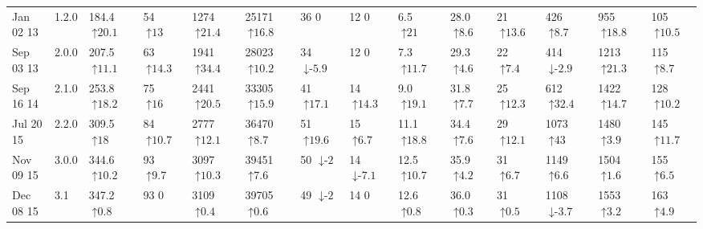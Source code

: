 \begin{tabular}{ll|llllll|lll|lll}
Jan 02 13 & 1.2.0 & 184.4 {\tiny $\uparrow\text{20.1}$} & 54 {\tiny $\uparrow\text{13}$} & 1274 {\tiny $\uparrow\text{21.4}$} & 25171 {\tiny $\uparrow\text{16.8}$} & 36 {\tiny $\text{0}$} & 12 {\tiny $\text{0}$} & 6.5 {\tiny $\uparrow\text{21}$} & 28.0 {\tiny $\uparrow\text{8.6}$} & 21 {\tiny $\uparrow\text{13.6}$} & 426 {\tiny $\uparrow\text{8.7}$} & 955 {\tiny $\uparrow\text{18.8}$} & 105 {\tiny $\uparrow\text{10.5}$} \\
Sep 03 13 & 2.0.0 & 207.5 {\tiny $\uparrow\text{11.1}$} & 63 {\tiny $\uparrow\text{14.3}$} & 1941 {\tiny $\uparrow\text{34.4}$} & 28023 {\tiny $\uparrow\text{10.2}$} & 34 {\tiny $\downarrow\text{-}\text{5.9}$} & 12 {\tiny $\text{0}$} & 7.3 {\tiny $\uparrow\text{11.7}$} & 29.3 {\tiny $\uparrow\text{4.6}$} & 22 {\tiny $\uparrow\text{7.4}$} & 414 {\tiny $\downarrow\text{-}\text{2.9}$} & 1213 {\tiny $\uparrow\text{21.3}$} & 115 {\tiny $\uparrow\text{8.7}$} \\
Sep 16 14 & 2.1.0 & 253.8 {\tiny $\uparrow\text{18.2}$} & 75 {\tiny $\uparrow\text{16}$} & 2441 {\tiny $\uparrow\text{20.5}$} & 33305 {\tiny $\uparrow\text{15.9}$} & 41 {\tiny $\uparrow\text{17.1}$} & 14 {\tiny $\uparrow\text{14.3}$} & 9.0 {\tiny $\uparrow\text{19.1}$} & 31.8 {\tiny $\uparrow\text{7.7}$} & 25 {\tiny $\uparrow\text{12.3}$} & 612 {\tiny $\uparrow\text{32.4}$} & 1422 {\tiny $\uparrow\text{14.7}$} & 128 {\tiny $\uparrow\text{10.2}$} \\
Jul 20 15 & 2.2.0 & 309.5 {\tiny $\uparrow\text{18}$} & 84 {\tiny $\uparrow\text{10.7}$} & 2777 {\tiny $\uparrow\text{12.1}$} & 36470 {\tiny $\uparrow\text{8.7}$} & 51 {\tiny $\uparrow\text{19.6}$} & 15 {\tiny $\uparrow\text{6.7}$} & 11.1 {\tiny $\uparrow\text{18.8}$} & 34.4 {\tiny $\uparrow\text{7.6}$} & 29 {\tiny $\uparrow\text{12.1}$} & 1073 {\tiny $\uparrow\text{43}$} & 1480 {\tiny $\uparrow\text{3.9}$} & 145 {\tiny $\uparrow\text{11.7}$} \\
Nov 09 15 & 3.0.0 & 344.6 {\tiny $\uparrow\text{10.2}$} & 93 {\tiny $\uparrow\text{9.7}$} & 3097 {\tiny $\uparrow\text{10.3}$} & 39451 {\tiny $\uparrow\text{7.6}$} & 50 {\tiny $\downarrow\text{-}\text{2}$} & 14 {\tiny $\downarrow\text{-}\text{7.1}$} & 12.5 {\tiny $\uparrow\text{10.7}$} & 35.9 {\tiny $\uparrow\text{4.2}$} & 31 {\tiny $\uparrow\text{6.7}$} & 1149 {\tiny $\uparrow\text{6.6}$} & 1504 {\tiny $\uparrow\text{1.6}$} & 155 {\tiny $\uparrow\text{6.5}$} \\
Dec 08 15 & 3.1 & 347.2 {\tiny $\uparrow\text{0.8}$} & 93 {\tiny $\text{0}$} & 3109 {\tiny $\uparrow\text{0.4}$} & 39705 {\tiny $\uparrow\text{0.6}$} & 49 {\tiny $\downarrow\text{-}\text{2}$} & 14 {\tiny $\text{0}$} & 12.6 {\tiny $\uparrow\text{0.8}$} & 36.0 {\tiny $\uparrow\text{0.3}$} & 31 {\tiny $\uparrow\text{0.5}$} & 1108 {\tiny $\downarrow\text{-}\text{3.7}$} & 1553 {\tiny $\uparrow\text{3.2}$} & 163 {\tiny $\uparrow\text{4.9}$} \\

\end{tabular}
